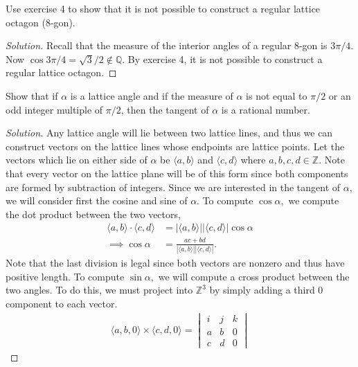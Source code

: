\documentclass[12pt]{article}
\newcommand{\Z}{\mathbb{Z}}
\newcommand{\Q}{\mathbb{Q}}
\newenvironment{exercise}[2][Exercise]{\begin{trivlist}
        \item[\hskip \labelsep {\bfseries #1}\hskip \labelsep {\bfseries #2.}]}{\end{trivlist}}
\newenvironment{solution}
        {\begin{proof}[Solution]}
                    {\end{proof}}
\begin{document}
\begin{exercise}{5}
    Use exercise 4 to show that it is not possible to construct a regular lattice octagon (8-gon).
    \begin{solution}
        Recall that the measure of the interior angles of a regular 8-gon is \( 3\pi/4. \) Now \( \cos 3\pi/4 = \sqrt{3} /2 \notin \Q.\) By exercise 4, it is not possible to construct a regular lattice octagon.
    \end{solution}
\end{exercise}

\begin{exercise}{6}
    Show that if \(\alpha\) is a lattice angle and if the measure of \(\alpha\) is not equal to \( \pi/2 \) or an odd integer multiple of \( \pi/2 \), then the tangent of \(\alpha\) is a rational number.
    \begin{solution}
        Any lattice angle will lie between two lattice lines, and thus we can construct vectors on the lattice lines whose endpoints are lattice points. Let the vectors which lie on either side of \( \alpha \) be \( \langle a,b \rangle \) and \( \langle c,d \rangle \) where \( a,b,c,d \in \Z. \) Note that every vector on the lattice plane will be of this form since both components are formed by subtraction of integers. Since we are interested in the tangent of \( \alpha \), we will consider first the cosine and sine of \( \alpha. \) To compute \( \cos\alpha, \) we compute the dot product between the two vectors,
        \begin{align*}
            \langle a,b \rangle \cdot \langle c,d \rangle &= \left| \langle a,b \rangle \right| \left| \langle c,d \rangle \right| \cos\alpha\\
            \implies\cos\alpha &= \frac{ac+bd}{\left| \langle a,b \rangle \right| \left| \langle c,d \rangle \right|}.
        \end{align*}
        Note that the last division is legal since both vectors are nonzero and thus have positive length. To compute \( \sin\alpha, \) we will compute a cross product between the two angles. To do this, we must project into \( \Z^{3} \) by simply adding a third 0 component to each vector.
        \begin{align*}
            \langle a,b,0 \rangle \times \langle c,d,0 \rangle =
            \begin{vmatrix}
                i & j & k\\
                a & b & 0\\
                c & d & 0

\end{vmatrix}
\end{align*}
\end{solution}
\end{exercise}
\end{document}
